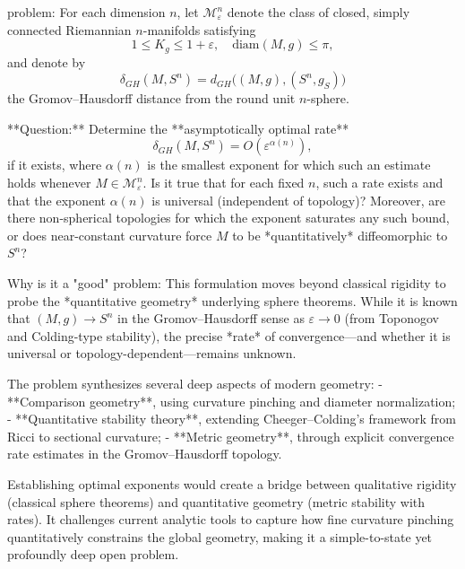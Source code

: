 problem:  
For each dimension \( n \), let \( \mathcal{M}_\varepsilon^n \) denote the class of closed, simply connected Riemannian \( n\)-manifolds satisfying  
\[
1 \le K_g \le 1+\varepsilon, \quad \mathrm{diam}(M,g) \le \pi,
\]
and denote by  
\[
\delta_{GH}(M,S^n) = d_{GH}\big((M,g), (S^n, g_{S})\big)
\]
the Gromov–Hausdorff distance from the round unit \( n\)-sphere.

**Question:**  
Determine the **asymptotically optimal rate**  
\[
\delta_{GH}(M, S^n) = O(\varepsilon^{\alpha(n)}),
\]
if it exists, where \( \alpha(n) \) is the smallest exponent for which such an estimate holds whenever \( M \in \mathcal{M}_\varepsilon^n \).  
Is it true that for each fixed \( n \), such a rate exists and that the exponent \( \alpha(n) \) is universal (independent of topology)?  
Moreover, are there non-spherical topologies for which the exponent saturates any such bound, or does near-constant curvature force \( M \) to be *quantitatively* diffeomorphic to \( S^n \)?  

Why is it a "good" problem:  
This formulation moves beyond classical rigidity to probe the *quantitative geometry* underlying sphere theorems. While it is known that \( (M,g) \to S^n \) in the Gromov–Hausdorff sense as \( \varepsilon \to 0 \) (from Toponogov and Colding-type stability), the precise *rate* of convergence—and whether it is universal or topology-dependent—remains unknown.  

The problem synthesizes several deep aspects of modern geometry:
- **Comparison geometry**, using curvature pinching and diameter normalization;
- **Quantitative stability theory**, extending Cheeger–Colding’s framework from Ricci to sectional curvature;
- **Metric geometry**, through explicit convergence rate estimates in the Gromov–Hausdorff topology.

Establishing optimal exponents would create a bridge between qualitative rigidity (classical sphere theorems) and quantitative geometry (metric stability with rates). It challenges current analytic tools to capture how fine curvature pinching quantitatively constrains the global geometry, making it a simple-to-state yet profoundly deep open problem.